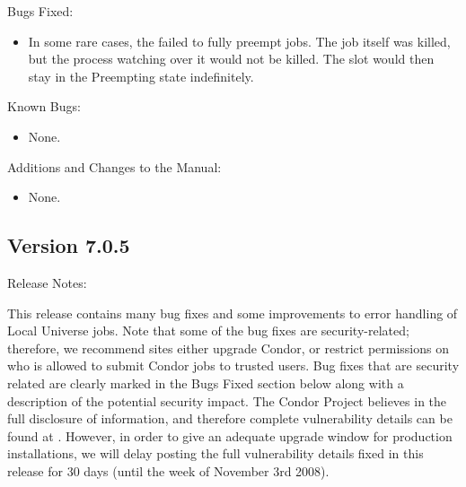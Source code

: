 \noindent Bugs Fixed:

\begin{itemize}

\item In some rare cases, the  failed to fully preempt jobs.
The job itself was killed, but the  process watching over
it would not be killed.  The slot would then stay in the Preempting state
indefinitely.

\end{itemize}

\noindent Known Bugs:

\begin{itemize}

\item None.

\end{itemize}

\noindent Additions and Changes to the Manual:

\begin{itemize}

\item None.

\end{itemize}


\subsection*{\label{sec:New-7-0-5}Version 7.0.5}

\noindent Release Notes:

This release contains many bug fixes and some improvements to error handling
of Local Universe jobs. Note that some of the bug fixes are
security-related; therefore, we recommend sites either upgrade Condor, or
restrict permissions on who is allowed to submit Condor jobs to trusted
users. Bug fixes that are security related are clearly marked in the Bugs
Fixed section below along with a description of the potential security
impact. The Condor Project believes in the full disclosure of information,
and therefore complete vulnerability details can be found at
. However, in order to give an
adequate upgrade window for production installations, we will delay posting
the full vulnerability details fixed in this release for 30 days (until the
week of November 3rd 2008). 


